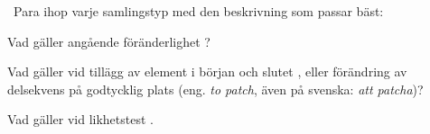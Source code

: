 \QUESTEND






\QUESTBEGIN

\Task \what~Para ihop varje samlingstyp med den beskrivning som passar bäst:

\Subtask Vad gäller angående föränderlighet ?

\begin{ConceptConnections}

\end{ConceptConnections}

\Subtask Vad gäller vid tillägg av element i början  och slutet , eller förändring av delsekvens på godtycklig plats (eng. \emph{to patch}, även på svenska: \emph{att patcha})?

\begin{ConceptConnections}

\end{ConceptConnections}

\Subtask Vad gäller vid likhetstest .

\begin{ConceptConnections}

\end{ConceptConnections}


\SOLUTION

\TaskSolved \what

\Subtask

\begin{ConceptConnections}

\end{ConceptConnections}

\Subtask

\begin{ConceptConnections}

\end{ConceptConnections}

\Subtask

\begin{ConceptConnections}

\end{ConceptConnections}

\QUESTEND







